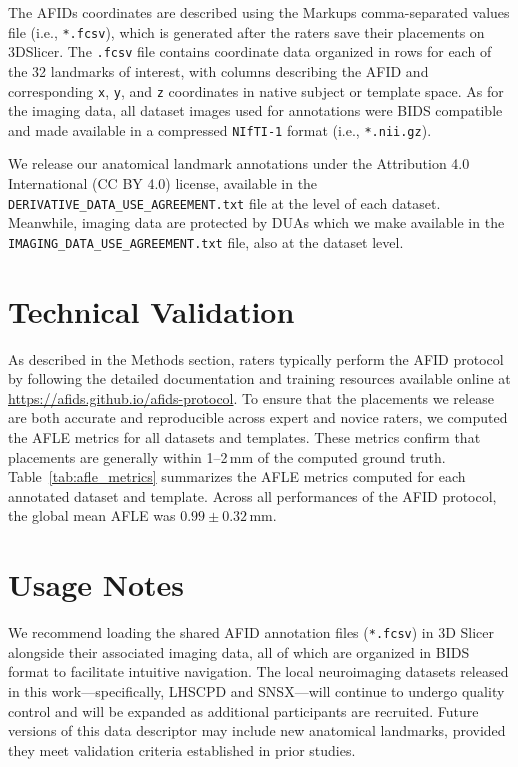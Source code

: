 The AFIDs coordinates are described using the Markups comma-separated values file (i.e., \texttt{*.fcsv}), which is generated after the raters save their placements on 3DSlicer. The \texttt{.fcsv} file contains coordinate data organized in rows for each of the 32 landmarks of interest, with columns describing the AFID and corresponding \texttt{x}, \texttt{y}, and \texttt{z} coordinates in native subject or template space. As for the imaging data, all dataset images used for annotations were BIDS compatible and made available in a compressed \texttt{NIfTI-1} format (i.e., \texttt{*.nii.gz}).

We release our anatomical landmark annotations under the Attribution 4.0 International (CC BY 4.0) license, available in the \texttt{DERIVATIVE\_DATA\_USE\_AGREEMENT.txt} file at the level of each dataset. Meanwhile, imaging data are protected by DUAs which we make available in the \texttt{IMAGING\_DATA\_USE\_AGREEMENT.txt} file, also at the dataset level.


\section{Technical Validation}
As described in the Methods section, raters typically perform the AFID protocol by following the detailed documentation and training resources available online at \url{https://afids.github.io/afids-protocol}. To ensure that the placements we release are both accurate and reproducible across expert and novice raters, we computed the AFLE metrics for all datasets and templates. These metrics confirm that placements are generally within 1–2\,mm of the computed ground truth.  Table~\ref{tab:afle_metrics} summarizes the AFLE metrics computed for each annotated dataset and template. Across all performances of the AFID protocol, the global mean AFLE was $0.99 \pm 0.32$\,mm.


\section{Usage Notes}
We recommend loading the shared AFID annotation files (\texttt{*.fcsv}) in 3D Slicer alongside their associated imaging data, all of which are organized in BIDS format to facilitate intuitive navigation. The local neuroimaging datasets released in this work—specifically, LHSCPD and SNSX—will continue to undergo quality control and will be expanded as additional participants are recruited. Future versions of this data descriptor may include new anatomical landmarks, provided they meet validation criteria established in prior studies.

